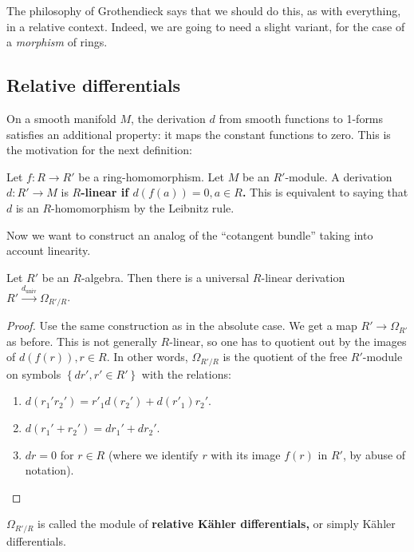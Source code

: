 The philosophy of Grothendieck says that we should do this, as with everything,
in a relative context.
Indeed, we are going to need a slight variant, for the case of a \emph{morphism} of
rings.

\subsection{Relative differentials}

On a smooth manifold $M$, the derivation $d$ from smooth functions to 1-forms
satisfies an additional property: it maps the constant functions to zero. 
This is the motivation for the next definition:

\begin{definition} 
Let $f: R \to R'$ be a ring-homomorphism. Let $M$ be an $R'$-module. A
derivation $d: R' \to M$ is \textbf{$R$-linear if $d(f(a)) = 0, a \in R$.}
This is equivalent to saying that $d$ is an $R$-homomorphism by the Leibnitz
rule.
\end{definition} 

Now we want to construct an analog of the ``cotangent bundle'' taking into
account linearity. 

\begin{proposition} 
Let $R'$ be an $R$-algebra.
Then there is a universal $R$-linear derivation $R'
\stackrel{d_{\mathrm{univ}}}{\to} \Omega_{R'/R}$.
\end{proposition} 
\begin{proof} 
Use the same construction as in the absolute case. We get a map $R' \to
\Omega_{R'}$ as before. This is not generally $R$-linear, so one has to
quotient out by the images of $d(f(r)), r \in R$.
In other words, $\Omega_{R'/R}$ is the quotient of the free $R'$-module on
symbols $\left\{dr', r' \in R'\right\}$ with the relations:
\begin{enumerate}
\item $d(r_1' r_2') = r'_1 d(r_2') + d(r'_1) r_2'$. 
\item $d(r_1' + r_2') = dr_1' + dr_2'$.
\item  $dr = 0$ for $r \in R$ (where we identify $r$ with its image $f(r)$ in
$R'$, by abuse of notation).
\end{enumerate}
\end{proof} 

\begin{definition} 
$\Omega_{R'/R}$ is called the module of \textbf{relative K\"ahler
differentials,} or simply K\"ahler differentials.
\end{definition} 

